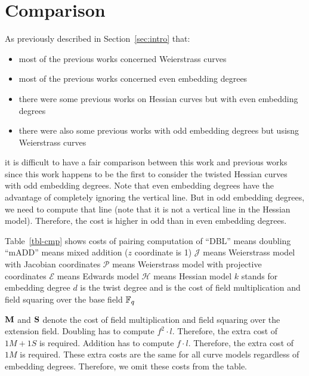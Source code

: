 \section{Comparison}

As previously described in Section~\ref{sec:intro} that:
\begin{itemize}
\item	most of the previous works concerned Weierstrass curves
\item	most of the previous works concerned even embedding degrees
\item	there were some previous works on Hessian curves but with even embedding degrees
\item	there were also some previous works with odd embedding degrees but usisng Weierstrass curves
\end{itemize}
it is difficult to have a fair comparison between this work and previous works
since this work happens to be the first to consider the twisted Hessian curves with odd embedding degrees.
Note that even embedding degrees have the advantage of completely ignoring the vertical line.
But in odd embedding degrees, we need to compute that line (note that it is not a vertical line in the Hessian model).
Therefore, the cost is higher in odd than in even embedding degrees.

Table~\ref{tbl-cmp} shows costs of pairing computation of 
``DBL'' means doubling
``mADD'' means mixed addition ($z$ coordinate is 1)
$\mathcal{J}$ means Weierstrass model with Jacobian coordinates
$\mathcal{P}$ means Weierstrass model with projective coordinates
$\mathcal{E}$ means Edwards model
$\mathcal{H}$ means Hessian model
$k$ stands for embedding degree
$d$ is the twist degree
\mul and \sqr is the cost of field multiplication and field squaring over the base field $\mathbb{F}_{q}$

$\textbf{M}$ and $\textbf{S}$ denote the cost of field multiplication and field squaring over the extension field.
Doubling has to compute $f^2 \cdot l$.
Therefore, the extra cost of $1M + 1S$ is required.
Addition has to compute $f \cdot l$.
Therefore, the extra cost of $1M$ is required.
These extra costs are the same for all curve models regardless of embedding degrees.
Therefore, we omit these costs from the table.

